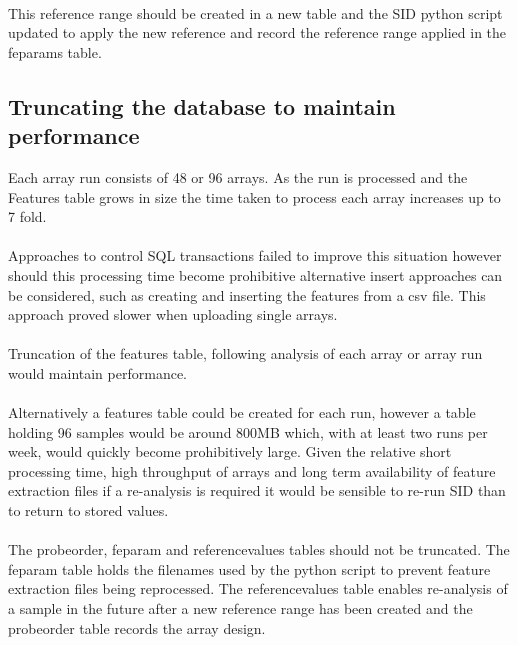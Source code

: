 \paragraph*{}
This reference range should be created in a new table and the SID python script updated to apply the new reference and record the reference range applied in the feparams table.

\subsection{Truncating the database to maintain performance}
Each array run consists of 48 or 96 arrays. As the run is processed and the Features table grows in size the time taken to process each array increases up to 7 fold.
\paragraph*{}
Approaches to control SQL transactions failed to improve this situation however should this processing time become prohibitive alternative insert approaches can be considered, such as creating and inserting the features from a \ac{csv} file. This approach proved slower when uploading single arrays.
\paragraph*{}
Truncation of the features table, following analysis of each array or array run would maintain performance.
\paragraph*{}
Alternatively a features table could be created for each run, however a table holding 96 samples would be around 800MB which, with at least two runs per week, would quickly become prohibitively large. Given the relative short processing time, high throughput of arrays and long term availability of feature extraction files if a re-analysis is required it would be sensible to re-run SID than to return to stored values.
\paragraph*{}
The probeorder, feparam and referencevalues tables should not be truncated. The feparam table holds the filenames used by the python script to prevent feature extraction files being reprocessed.  The referencevalues table enables re-analysis of a sample in the future after a new reference range has been created and the probeorder table records the array design.
